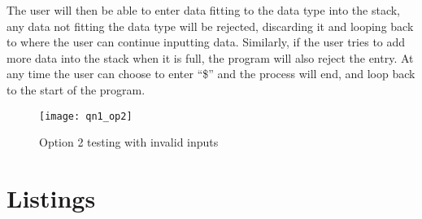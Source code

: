 \documentclass{report}
\begin{document}
The user will then be able to enter data fitting to the data type into the stack, any data not fitting the data type will be rejected, discarding it and looping back to where the user can continue inputting data. Similarly, if the user tries to add more data into the stack when it is full, the program will also reject the entry. At any time the user can choose to enter ``\$'' and the process will end, and loop back to the start of the program.

\begin{figure}[H]
	\centering
	\caption{Option 2 testing with invalid inputs}
	\texttt{[image: qn1\_op2]}
	\label{fig:qn1_op2}
\end{figure}
\section{Listings}
\end{document}

